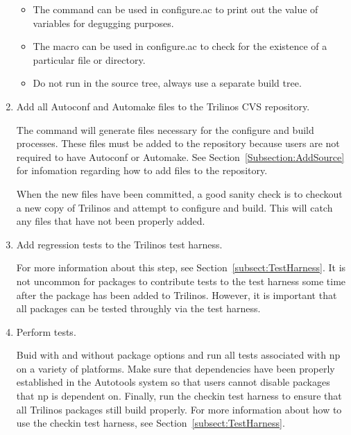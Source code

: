 \documentclass[12pt,strict]{TrilinosDevGuide}
\begin{document}
\begin{enumerate}
\begin{itemize}
\item The  command can be used in configure.ac to 
print out the value of variables for degugging purposes.

\item The  macro can be used in configure.ac to 
check for the existence of a particular file or directory.

\item Do not run  in the source tree, always use a 
separate build tree.

\end{itemize}

\item Add all Autoconf and Automake files to the Trilinos CVS repository.

The  command will generate files necessary for the 
configure and build processes.  These files must be added to the repository 
because users are not required to have Autoconf or Automake.  See 
Section~\ref{Subsection:AddSource} for infomation regarding how to add files 
to the repository.

When the new files have been committed, a good sanity check is to checkout 
a new copy of Trilinos and attempt to configure and build.  This will catch 
any files that have not been properly added.

\item Add regression tests to the Trilinos test harness.

For more information about this step, see Section~\ref{subsect:TestHarness}.
It is not uncommon for packages to contribute tests to the test harness some 
time after the package has been added to Trilinos.  However, it is important 
that all packages can be tested throughly via the test harness.

\item Perform tests.

Buid with and without package options and run all tests associated with np on 
a variety of platforms.  Make sure that dependencies have been properly 
established in the Autotools system so that users cannot disable packages that 
np is dependent on.  Finally, run the checkin test harness to ensure that 
all Trilinos packages still build properly.  For more information about how 
to use the checkin test harness, see Section~\ref{subsect:TestHarness}.

\end{enumerate}
\end{document}
